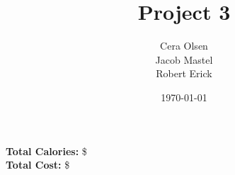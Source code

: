 \documentclass[11pt]{article}
\title{Project 3}
\author{Cera Olsen\\Jacob Mastel\\Robert Erick}
\date{\today}
\begin{document}
	\maketitle\textbf{Total Calories:} \$ \\
\textbf{Total Cost:} \$
	
	
\end{document}
